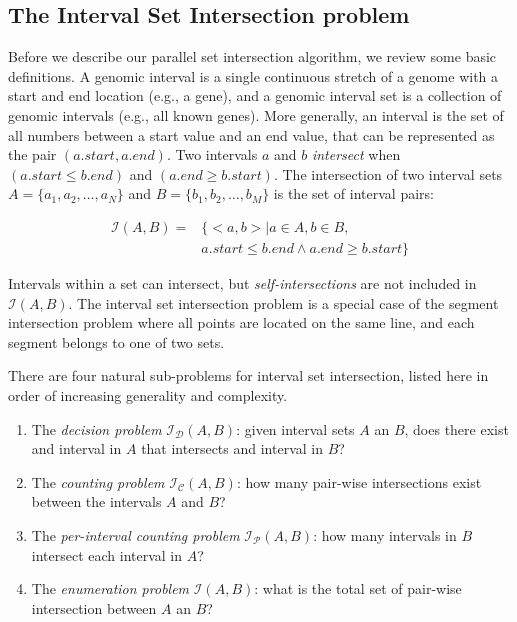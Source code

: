 \documentclass{bioinfo}
\begin{document}
	\subsection{The Interval Set Intersection problem}
	Before we describe our parallel set intersection algorithm, we review some basic
	definitions.  A genomic interval is a single continuous stretch of a genome with
	a start and end location (e.g., a gene), and a genomic interval set is a
	collection of genomic intervals (e.g., all known genes).  More generally, an
	interval is the set of all numbers between a start value and an end value, that
	can be represented as the pair $(a.start, a.end)$.  Two intervals $a$ and $b$
	{\em intersect} when $(a.start \leq b.end)$ and $(a.end \geq b.start)$.  The
	intersection of two interval sets $A=\{a_1, a_2, \dots, a_N\}$ and
	$B=\{b_1, b_2, \dots, b_M\}$ is the set of interval pairs:

	\begin{equation*}
		\begin{split}
			\mathcal{I}(A,B)= &\{ <a,b> | a \in A, b \in B, \\
			& a.start \leq b.end \wedge a.end \geq b.start\}
		\end{split}
	\end{equation*}

	Intervals within a set can intersect, but {\em self-intersections} are not
	included in $\mathcal{I}(A,B)$.  The interval set intersection problem is a
	special case of the segment intersection problem where all points are located on
	the same line, and each segment belongs to one of two sets.

	There are four natural sub-problems for interval set intersection, listed here
	in order of increasing generality and complexity.
	\begin{enumerate}
		\item The {\em decision problem} $\mathcal{I_D}(A,B)$:  given interval sets $A$
		an $B$, does there exist and interval in $A$ that intersects and interval in
		$B$?
		\item The {\em counting problem} $\mathcal{I_C}(A,B)$: how many pair-wise
		intersections exist between the intervals $A$ and $B$?
		\item The {\em per-interval counting problem} $\mathcal{I_P}(A,B)$: how many
		intervals in $B$ intersect each interval in $A$?
		\item The {\em enumeration problem} $\mathcal{I}(A,B)$: what is the total set of
		pair-wise intersection between $A$ an $B$?
	\end{enumerate}
\end{document}
